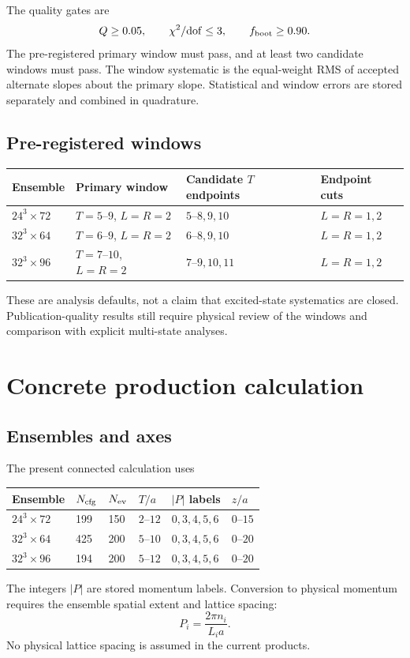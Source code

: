 \documentclass[11pt]{article}
\numberwithin{equation}{section}
\begin{document}
The quality gates are
\begin{equation}
  Q\geq0.05,\qquad
  \chi^2/{\rm dof}\leq3,
  \qquad f_{\rm boot}\geq0.90.
  \label{eq:fit-gates}
\end{equation}
The pre-registered primary window must pass, and at least two candidate
windows must pass.  The window systematic is the equal-weight RMS of accepted
alternate slopes about the primary slope.  Statistical and window errors are
stored separately and combined in quadrature.

\subsection{Pre-registered windows}

\begin{center}
\begin{tabular}{llll}
\toprule
Ensemble & Primary window & Candidate $T$ endpoints & Endpoint cuts\\
\midrule
$24^3\times72$ & $T=5\text{--}9$, $L=R=2$ & $5\text{--}8,9,10$ & $L=R=1,2$\\
$32^3\times64$ & $T=6\text{--}9$, $L=R=2$ & $6\text{--}8,9,10$ & $L=R=1,2$\\
$32^3\times96$ & $T=7\text{--}10$, $L=R=2$ & $7\text{--}9,10,11$ & $L=R=1,2$\\
\bottomrule
\end{tabular}
\end{center}
These are analysis defaults, not a claim that excited-state systematics are
closed.  Publication-quality results still require physical review of the
windows and comparison with explicit multi-state analyses.

\section{Concrete production calculation}

\subsection{Ensembles and axes}

The present connected calculation uses
\begin{center}
\begin{tabular}{llllll}
\toprule
Ensemble & $N_{\rm cfg}$ & $N_{\rm ev}$ & $T/a$ & $|P|$ labels & $z/a$\\
\midrule
$24^3\times72$ & 199 & 150 & $2\text{--}12$ & $0,3,4,5,6$ & $0\text{--}15$\\
$32^3\times64$ & 425 & 200 & $5\text{--}10$ & $0,3,4,5,6$ & $0\text{--}20$\\
$32^3\times96$ & 194 & 200 & $5\text{--}12$ & $0,3,4,5,6$ & $0\text{--}20$\\
\bottomrule
\end{tabular}
\end{center}
The integers $|P|$ are stored momentum labels.  Conversion to physical
momentum requires the ensemble spatial extent and lattice spacing:
\begin{equation}
  P_i=\frac{2\pi n_i}{L_i a}.
  \label{eq:lattice-momentum}
\end{equation}
No physical lattice spacing is assumed in the current products.
\end{document}
